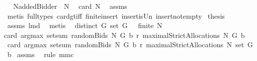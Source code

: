 \begin{isabellebody}
%
\isadelimproof
%
\endisadelimproof
%
\isatagproof
{}\isamarkupfalse%
\ {\isacharminus}\isanewline
{}\isamarkupfalse%
\ {\isacharquery}N{\isacharequal}{\isachardoublequoteopen}{\isacharbraceleft}addedBidder{\isacharprime}{\isacharbraceright}\ {\isasymunion}\ N{\isachardoublequoteclose}\ \isanewline
{}\isamarkupfalse%
\ {\isachardoublequoteopen}card\ {\isacharquery}N{\isachargreater}{}{\isachardoublequoteclose}\ \isamarkupfalse%
\ assms{\isacharparenleft}{}{\isacharparenright}\ \isamarkupfalse%
\ {\isacharparenleft}metis\ {\isacharparenleft}full{\isacharunderscore}types{\isacharparenright}\ card{\isacharunderscore}gt{\isacharunderscore}{}{\isacharunderscore}iff\ finite{\isacharunderscore}insert\ insert{\isacharunderscore}is{\isacharunderscore}Un\ insert{\isacharunderscore}not{\isacharunderscore}empty{\isacharparenright}\isanewline
{}\isamarkupfalse%
\ {\isacharquery}thesis\ \isamarkupfalse%
\ assms{\isacharparenleft}{}{\isacharparenright}\ lm{}{}d\ \isamarkupfalse%
\ metis\isanewline
{}\isamarkupfalse%
%
\endisatagproof
{\isafoldproof}%
%
\isadelimproof
\isanewline
%
\endisadelimproof
{}\isamarkupfalse%
\ \ {\isachardoublequoteopen}distinct\ G{\isachardoublequoteclose}\ {\isachardoublequoteopen}set\ G\ {\isasymnoteq}\ {\isacharbraceleft}{\isacharbraceright}{\isachardoublequoteclose}\ {\isachardoublequoteopen}finite\ N{\isachardoublequoteclose}\ \ \isanewline
{\isachardoublequoteopen}{}{\isacharequal}card\ {\isacharparenleft}argmax\ {\isacharparenleft}setsum\ {\isacharparenleft}randomBids\ N\ G\ b\ r{\isacharparenright}{\isacharparenright}\ {\isacharparenleft}maximalStrictAllocations\ N\ G\ b{\isacharparenright}{\isacharparenright}{\isachardoublequoteclose}\isanewline
%
\isadelimproof
%
\endisadelimproof
%
\isatagproof
{}\isamarkupfalse%
\ {\isacharminus}\ \isanewline
{}\isamarkupfalse%
\ {\isachardoublequoteopen}{}{\isacharequal}card\ {\isacharparenleft}argmax\ {\isacharparenleft}setsum\ {\isacharparenleft}randomBids\ N\ G\ b\ r{\isacharparenright}{\isacharparenright}\ {\isacharparenleft}maximalStrictAllocations{\isacharprime}\ N\ {\isacharparenleft}set\ G{\isacharparenright}\ b{\isacharparenright}{\isacharparenright}{\isachardoublequoteclose}\isanewline
{}\isamarkupfalse%
\ assms\ \isamarkupfalse%
\ {\isacharparenleft}rule\ mm{}{}c{\isacharparenright}\isanewline

\end{isabellebody}
